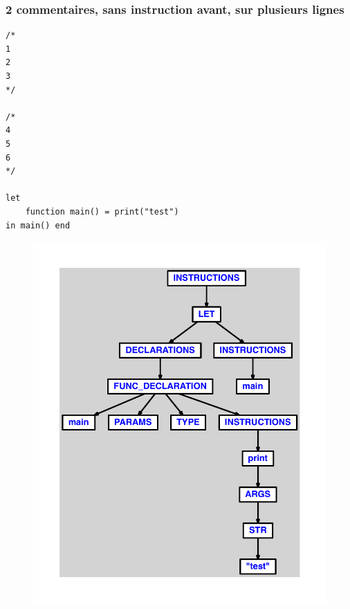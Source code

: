 \documentclass{article}
\begin{document}
\subsubsection{2 commentaires, sans instruction avant, sur plusieurs lignes}
\begin{lstlisting}
/*
1
2
3
*/

/*
4
5
6
*/

let
	function main() = print("test")
in main() end
\end{lstlisting}
\newpage
\begin{figure}[H]
\centering
\includegraphics[max width=\textwidth]{ast/ast_155.pdf}
\end{figure}
\newpage
\end{document}

